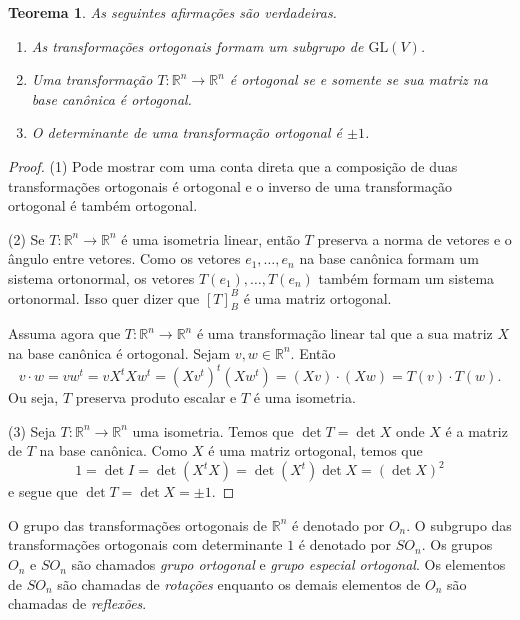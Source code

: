 \documentclass[12pt]{amsart}
\newcommand{\R}{\mathbb R}
\newcommand{\glv}[1]{\mbox{GL}(#1)}
\newtheorem{theorem}{Teorema}
\theoremstyle{definition}
\begin{document}
\begin{theorem}
    As seguintes afirmações são verdadeiras.
    \begin{enumerate}
        \item As transformações ortogonais formam um subgrupo de $\glv V$.
        \item Uma transformação $T:\R^n\to \R^n$ é ortogonal se e somente se sua matriz na base 
        canônica é ortogonal.
        \item O determinante de uma transformação ortogonal é $\pm 1$.  
    \end{enumerate}
\end{theorem}
\begin{proof}
    (1) Pode mostrar com uma conta direta que a composição de duas transformações ortogonais é ortogonal 
    e o inverso de uma transformação ortogonal é também ortogonal.

    (2) Se $T:\R^n\to \R^n$ é uma isometria linear, então $T$ preserva a norma de vetores e o ângulo entre vetores.
    Como os vetores $e_1,\ldots,e_n$ na base canônica formam um sistema ortonormal, 
    os vetores $T(e_1),\ldots,T(e_n)$ também formam um sistema ortonormal. Isso quer dizer que 
    $[T]_B^B$ é uma matriz ortogonal.
    
    Assuma agora que $T:\R^n\to \R^n$ é uma transformação linear tal que a sua matriz 
    $X$ na base canônica é ortogonal. Sejam $v,w\in\R^n$. Então  
    \[
        v\cdot w=vw^t=vX^tXw^t=(Xv^t)^t(Xw^t)=(Xv)\cdot (Xw)=T(v)\cdot T(w).
    \]
    Ou seja, $T$ preserva produto escalar e $T$ é uma isometria. 

    (3) Seja $T:\R^n\to \R^n$ uma isometria. Temos que $\det T=\det X$ onde $X$ é a matriz de $T$ na 
    base canônica. Como $X$ é uma matriz ortogonal, temos que 
    \[
        1=\det I=\det(X^tX)=\det(X^t)\det X=(\det X)^2
    \]
    e segue que $\det T=\det X=\pm 1$. 
\end{proof}

O grupo das transformações ortogonais de $\R^n$ é denotado por $O_n$. O subgrupo das transformações 
ortogonais com determinante $1$ é denotado por $SO_n$. Os grupos $O_n$ e $SO_n$ são chamados 
\emph{grupo ortogonal} e \emph{grupo especial ortogonal}. Os elementos de $SO_n$ são chamadas de \emph{rotações}
enquanto os demais elementos de $O_n$ são chamadas de \emph{reflexões}.
\end{document}
